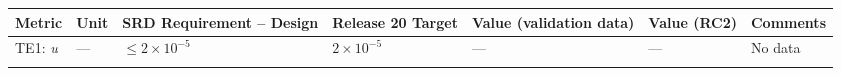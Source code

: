 \documentclass[DM,lsstdraft,toc]{lsstdoc}
\begin{document}
\begin{longtable}[]{@{}lllllll@{}}
\toprule
\begin{minipage}[b]{0.12\columnwidth}\raggedright\strut
Metric\strut
\end{minipage} & \begin{minipage}[b]{0.06\columnwidth}\raggedright\strut
Unit\strut
\end{minipage} & \begin{minipage}[b]{0.14\columnwidth}\raggedright\strut
SRD Requirement -- Design\strut
\end{minipage} & \begin{minipage}[b]{0.14\columnwidth}\raggedright\strut
Release 20 Target\strut
\end{minipage} & \begin{minipage}[b]{0.12\columnwidth}\raggedright\strut
Value (validation data)\strut
\end{minipage} & \begin{minipage}[b]{0.12\columnwidth}\raggedright\strut
Value (RC2) \strut
\end{minipage} & \begin{minipage}[b]{0.17\columnwidth}\raggedright\strut
Comments\strut
\end{minipage}\tabularnewline
\midrule
\endhead
\begin{minipage}[t]{0.12\columnwidth}\raggedright\strut
TE1: \emph{u}\strut
\end{minipage} & \begin{minipage}[t]{0.06\columnwidth}\raggedright\strut
---\strut
\end{minipage} & \begin{minipage}[t]{0.14\columnwidth}\raggedright\strut
\(\leq 2\times10^{-5}\)\strut
\end{minipage} & \begin{minipage}[t]{0.14\columnwidth}\raggedright\strut
\(2\times10^{-5}\)\strut
\end{minipage} & \begin{minipage}[t]{0.12\columnwidth}\raggedright\strut
---\strut
\end{minipage} & \begin{minipage}[t]{0.12\columnwidth}\raggedright\strut
--- \strut
\end{minipage} & \begin{minipage}[t]{0.17\columnwidth}\raggedright\strut
No data\strut
\end{minipage}\tabularnewline
\begin{minipage}[t]{0.12\columnwidth}\raggedright\strut

\end{minipage}
\end{longtable}
\end{document}
